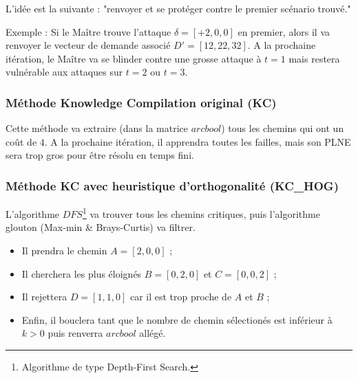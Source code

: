 \documentclass[11pt,a4paper]{article}
\begin{document}
L'idée est la suivante : "renvoyer et se protéger contre le premier scénario trouvé."

Exemple : Si le Maître trouve l'attaque $\delta=[+2, 0, 0]$ en premier, alors il va renvoyer le vecteur de demande associé $D'=[12, 22, 32]$. A la prochaine itération, le Maître va se blinder contre une grosse attaque à $t=1$ mais restera vulnérable aux attaques sur $t=2$ ou $t=3$.


\subsubsection{Méthode Knowledge Compilation original (KC)}

Cette méthode va extraire (dans la matrice $arcbool$) tous les chemins qui ont un coût de $4$.
A la prochaine itération, il apprendra toutes les failles, mais son PLNE sera trop gros pour être résolu en temps fini.


\subsubsection{Méthode KC avec heuristique d'orthogonalité (KC\_HOG)}

L'algorithme $DFS$\footnote{Algorithme de type Depth-First Search.} va trouver tous les chemins critiques, puis l'algorithme glouton (Max-min \& Brays-Curtis) va filtrer.

\begin{itemize}
    \item Il prendra le chemin $A=[2, 0, 0]$ ;
    \item Il cherchera les plus éloignés $B=[0, 2, 0]$ et $C=[0, 0, 2]$ ;
    \item Il rejettera $D=[1, 1, 0]$ car il est trop proche de $A$ et $B$ ;
    \item Enfin, il bouclera tant que le nombre de chemin sélectionés est inférieur à $k>0$ puis renverra $arcbool$ allégé.
\end{itemize}
\end{document}
